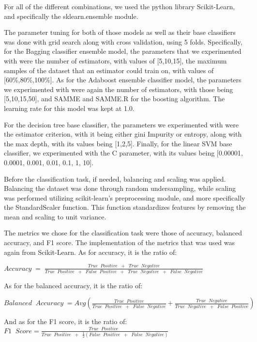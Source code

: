 {For all of the different combinations, we used the python library Scikit-Learn, and specifically the sklearn.ensemble module.

The parameter tuning for both of those models as well as their base classifiers was done with grid search along with cross validation, using 5 folds. Specifically, for the Bagging classifier ensemble model, the parameters that we experimented with were the number of estimators, with values of [5,10,15], the maximum samples of the dataset that an estimator could train on, with values of [60\%,80\%,100\%]. As for the Adaboost ensemble classifier model, the parameters we experimented with were again the number of estimators, with those being [5,10,15,50], and SAMME and SAMME.R for the boosting algorithm. The learning rate for this model was kept at 1.0.

For the decision tree base classifier, the parameters we experimented with were the estimator criterion, with it being either gini Impurity or entropy, along with the max depth, with its values being [1,2,5]. Finally, for the linear SVM base classifier, we experimented with the C parameter, with its values being [0.00001, 0.0001, 0.001, 0.01, 0.1, 1, 10].

Before the classification task, if needed, balancing and scaling was applied. Balancing the dataset was done through random undersampling, while scaling was performed utilizing scikit-learn's preprocessing module, and more specifically the StandardScaler function. This function standardizes features by removing the mean and scaling to unit variance.

The metrics we chose for the classification task were those of accuracy, balanced accuracy, and F1 score. The implementation of the metrics that was used was again from Scikit-Learn. As for accuracy, it is the ratio of: 

\bigbreak
$Accuracy \; = \;{{\frac{True\;\; Positive\;\; +\;\;True\;\; Negative}{True\;\; Positive\;\; + \;\;False \;\;Positive\;\; + \;\;True\;\; Negative\;\; + \;\;False\;\; Negative}}}$
\bigbreak

As for the balanced accuracy, it is the ratio of:

\bigbreak
$Balanced \;\;Accuracy \; =Avg({\frac{True\;\;Positive} {True \;\;Positive \;\;+\;\; False \;\;Negative} }+ {\frac{True \;\;Negative}{True \;\; Negative \;\;+\;\;False \;\;Positive}})$
\bigbreak

And as for the F1 score, it is the ratio of:
\bigbreak
$F1 \;\; Score = {\frac{True\;\; Positive\;\;}{ True\;\; Positive\;\; + \;\;{\frac{1}{2}}( False \;\;Positive\;\; + \;\;False\;\; Negative)}}$
\bigbreak
}